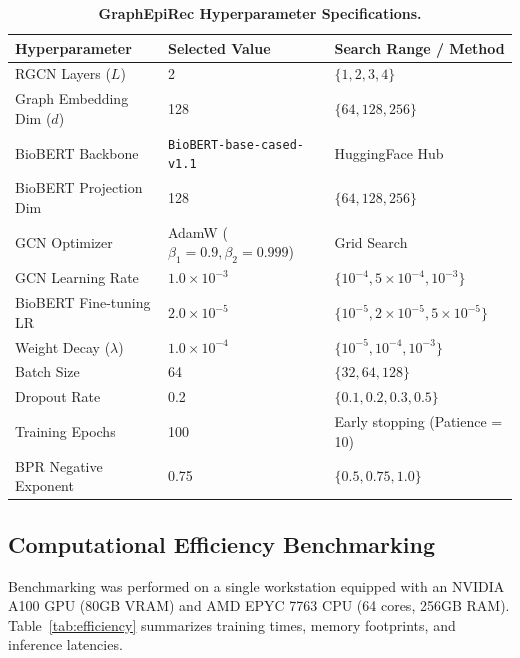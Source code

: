 \documentclass[11pt,a4paper]{article}
\begin{document}
\begin{table}[t]
\begin{table}[h]
\centering
\caption{\textbf{GraphEpiRec Hyperparameter Specifications.}}
\label{tab:hyperparams}
\small
\begin{tabular}{lll}
\toprule
\textbf{Hyperparameter} & \textbf{Selected Value} & \textbf{Search Range / Method} \\
\midrule
RGCN Layers ($L$) & 2 & $\{1, 2, 3, 4\}$ \\
Graph Embedding Dim ($d$) & 128 & $\{64, 128, 256\}$ \\
BioBERT Backbone & \texttt{BioBERT-base-cased-v1.1} & HuggingFace Hub \\
BioBERT Projection Dim & 128 & $\{64, 128, 256\}$ \\
GCN Optimizer & AdamW ($\beta_1=0.9, \beta_2=0.999$) & Grid Search \\
GCN Learning Rate & $1.0 \times 10^{-3}$ & $\{10^{-4}, 5\times 10^{-4}, 10^{-3}\}$ \\
BioBERT Fine-tuning LR & $2.0 \times 10^{-5}$ & $\{10^{-5}, 2\times 10^{-5}, 5\times 10^{-5}\}$ \\
Weight Decay ($\lambda$) & $1.0 \times 10^{-4}$ & $\{10^{-5}, 10^{-4}, 10^{-3}\}$ \\
Batch Size & 64 & $\{32, 64, 128\}$ \\
Dropout Rate & 0.2 & $\{0.1, 0.2, 0.3, 0.5\}$ \\
Training Epochs & 100 & Early stopping (Patience = 10) \\
BPR Negative Exponent & 0.75 & $\{0.5, 0.75, 1.0\}$ \\
\bottomrule
\end{tabular}
\end{table}

\subsection{Computational Efficiency Benchmarking}
Benchmarking was performed on a single workstation equipped with an NVIDIA A100 GPU (80GB VRAM) and AMD EPYC 7763 CPU (64 cores, 256GB RAM). Table~\ref{tab:efficiency} summarizes training times, memory footprints, and inference latencies.


\end{table}
\end{document}
